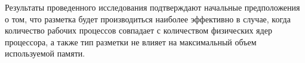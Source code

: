 Результаты проведенного исследования подтверждают начальные предположения о том, что разметка будет производиться наиболее эффективно в случае, когда количество рабочих процессов совпадает с количеством физических ядер процессора, а также тип разметки не влияет на максимальный объем используемой памяти.



%
%
